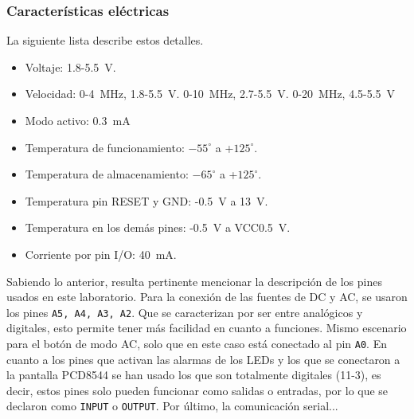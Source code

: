 \subsubsection*{Características eléctricas}
La siguiente lista describe estos detalles.
\begin{itemize}
\item Voltaje: 1.8-\SI{5.5}{\volt}.
\item Velocidad: 0-\SI{4}{\mega\Hz},  1.8-\SI{5.5}{\volt}. 0-\SI{10}{\mega\Hz},  2.7-\SI{5.5}{\volt}. 0-\SI{20}{\mega\Hz},  4.5-\SI{5.5}{\volt}
\item Modo activo: \SI{0.3}{\mA}
\item Temperatura de funcionamiento: $-55^\circ$ a +$125^\circ$.
\item Temperatura de almacenamiento: $-65^\circ$ a +$125^\circ$.
\item Temperatura pin RESET y GND: -\SI{0.5}{\volt} a \SI{13}{\volt}.
\item Temperatura en los demás pines: -\SI{0.5}{\volt} a VCC\SI{0.5}{\volt}.
\item Corriente por pin I/O: \SI{40}{\mA}.
\end{itemize}
Sabiendo lo anterior, resulta pertinente mencionar la descripción de los pines usados en este laboratorio. Para la conexión de las fuentes de DC y AC, se usaron los pines \texttt{A5, A4, A3, A2}. Que se caracterizan por ser entre analógicos y digitales, esto permite tener más facilidad en cuanto a funciones. Mismo escenario para el botón de modo AC, solo que en este caso está conectado al pin \texttt{A0}. En cuanto a los pines que activan las alarmas de los LEDs y los que se conectaron a la pantalla PCD8544 se han usado los que son totalmente digitales (11-3), es decir, estos pines solo pueden funcionar como salidas o entradas, por lo que se declaron como \texttt{INPUT} o \texttt{OUTPUT}. Por último, la comunicación serial... %
